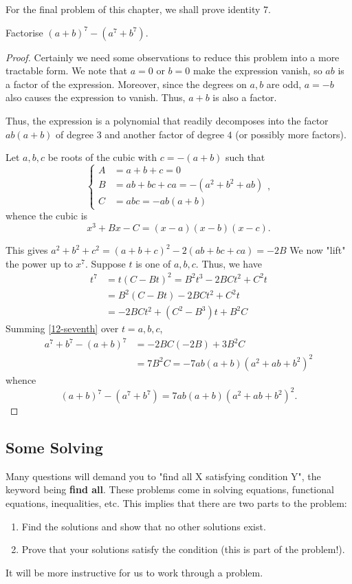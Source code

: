 \documentclass[../main.tex]{subfiles}
\begin{document}
For the final problem of this chapter, we shall prove identity 7.
\begin{example}[Classic]
    Factorise $(a+b)^7-(a^7+b^7)$.
\end{example}
\begin{proof}
    Certainly we need some observations to reduce this problem into a more tractable form. We note that $a=0$ or $b=0$ make the expression vanish, so $ab$ is a factor of the expression. Moreover, since the degrees on $a, b$ are odd, $a=-b$ also causes the expression to vanish. Thus, $a+b$ is also a factor.

    Thus, the expression is a polynomial that readily decomposes into the factor $ab(a+b)$ of degree $3$ and another factor of degree $4$ (or possibly more factors).

    Let $a,b,c$ be roots of the cubic with $c=-(a+b)$ such that
    $$\begin{cases}
        A&=a+b+c=0 \\
        B&=ab+bc+ca=-(a^2+b^2+ab) \\
        C&=abc=-ab(a+b)
    \end{cases},$$
    whence the cubic is $$x^3+Bx-C=(x-a)(x-b)(x-c).$$
    
    This gives $a^2+b^2+c^2=(a+b+c)^2-2(ab+bc+ca)=-2B$
    We now "lift" the power up to $x^7$. Suppose $t$ is one of $a,b,c$. Thus, we have
    \begin{align}
        t^7&=t(C-Bt)^2=B^2t^3-2BCt^2+C^2t \\
        &=B^2(C-Bt)-2BCt^2+C^2t \\
        &=-2BCt^2+(C^2-B^3)t+B^2C \label{12-seventh}
    \end{align}
    Summing \eqref{12-seventh} over $t=a,b,c$,
    \begin{align*}
        a^7+b^7-(a+b)^7&=-2BC(-2B)+3B^2C\\
        &=7B^2C=-7ab(a+b)(a^2+ab+b^2)^2
    \end{align*}
    whence $$(a+b)^7-(a^7+b^7)=7ab(a+b)(a^2+ab+b^2)^2.$$
\end{proof}

\subsection{Some Solving}
Many questions will demand you to "find all X satisfying condition Y", the keyword being \textbf{find all}. These problems come in solving equations, functional equations, inequalities, etc. This implies that there are two parts to the problem: 
\begin{enumerate}
    \item Find the solutions and show that no other solutions exist.
    \item Prove that your solutions satisfy the condition (this is part of the problem!).
\end{enumerate}
It will be more instructive for us to work through a problem.
\end{document}
